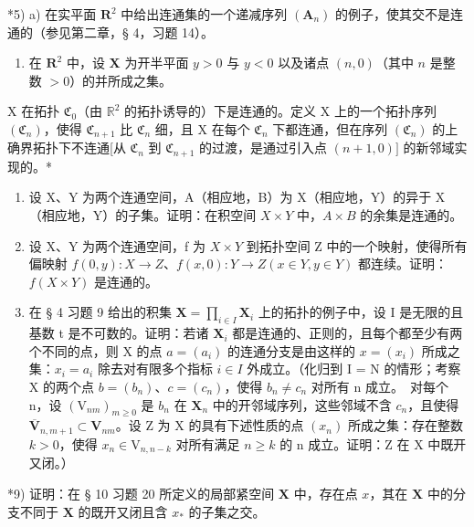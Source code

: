 *5) a) 在实平面 \(\mathbf{R}^2\) 中给出连通集的一个递减序列 \((\mathbf{A}_n)\) 的例子，使其交不是连通的（参见第二章，§ 4，习题 14）。

\begin{enumerate}
\def\labelenumi{\alph{enumi})}
\setcounter{enumi}{1}
\tightlist
\item
  在 \(\mathbf{R}^2\) 中，设 \(\mathbf{X}\) 为开半平面 \(y > 0\) 与 \(y < 0\) 以及诸点 \((n, 0)\)（其中 \(n\) 是整数 \(> 0\)）的并所成之集。
\end{enumerate}

X 在拓扑 \(\mathfrak{C}_0\)（由 \(\mathbb{R}^2\) 的拓扑诱导的）下是连通的。定义 X 上的一个拓扑序列 \((\mathfrak{C}_n)\)，使得 \(\mathfrak{C}_{n+1}\) 比 \(\mathfrak{C}_n\) 细，且 X 在每个 \(\mathfrak{C}_n\) 下都连通，但在序列 \((\mathfrak{C}_n)\) 的上确界拓扑下不连通{[}从 \(\mathfrak{C}_n\) 到 \(\mathfrak{C}_{n+1}\) 的过渡，是通过引入点 \((n+1,0)]\) 的新邻域实现的。*

\begin{enumerate}
\def\labelenumi{\arabic{enumi})}
\setcounter{enumi}{5}
\item
  设 X、Y 为两个连通空间，A（相应地，B）为 X（相应地，Y）的异于 X（相应地，Y）的子集。证明：在积空间 \(X \times Y\) 中，\(A \times B\) 的余集是连通的。
\item
  设 X、Y 为两个连通空间，f 为 \(X \times Y\) 到拓扑空间 Z 中的一个映射，使得所有偏映射 \(f(0, y) : X \to Z\)、\(f(x, 0) : Y \to Z (x \in Y, y \in Y)\) 都连续。证明：\(f(X \times Y)\) 是连通的。
\item
  在 § 4 习题 9 给出的积集 \(\mathbf{X} = \prod_{i\in I}\mathbf{X}_i\) 上的拓扑的例子中，设 I 是无限的且基数 t 是不可数的。证明：若诸 \(\mathbf{X}_i\) 都是连通的、正则的，且每个都至少有两个不同的点，则 X 的点 \(a = (a_i)\) 的连通分支是由这样的 \(x = (x_i)\) 所成之集：\(x_{i} = a_{i}\) 除去对有限多个指标 \(i\in I\) 外成立。（化归到 I = N 的情形；考察 X 的两个点 \(b = (b_n)\)、\(c = (c_n)\)，使得 \(b_{n}\neq c_{n}\) 对所有 n 成立。~对每个 n，设 \((\mathrm{V}_{nm})_{m\geqslant 0}\) 是 \(b_{n}\) 在 \(\mathbf{X}_n\) 中的开邻域序列，这些邻域不含 \(c_{n}\)，且使得 \(\overline{\mathbf{V}}_{n,m + 1}\subset \mathbf{V}_{nm}\)。设 Z 为 X 的具有下述性质的点 \((x_{n})\) 所成之集：存在整数 \(k > 0\)，使得 \(x_{n}\in \mathrm{V}_{n,n - k}\) 对所有满足 \(n\geqslant k\) 的 n 成立。证明：Z 在 X 中既开又闭。）
\end{enumerate}

*9) 证明：在 § 10 习题 20 所定义的局部紧空间 \(\mathbf{X}\) 中，存在点 \(x\)，其在 \(\mathbf{X}\) 中的分支不同于 \(\mathbf{X}\) 的既开又闭且含 \(x_*\) 的子集之交。

